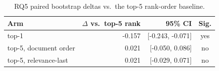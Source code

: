 \begin{table}[htbp]
  \centering
  \caption{RQ5 paired bootstrap deltas vs.\ the top-5 rank-order baseline.}
  \label{tab:rq5-deltas}
  \begin{tabular}{lrrc}
    \toprule
    Arm & $\Delta$ vs.\ top-5 rank & 95\% CI & Sig. \\
    \midrule
    top-1 & -0.157 & [-0.243, -0.071] & yes \\
    top-5, document order & 0.021 & [-0.050, 0.086] & no \\
    top-5, relevance-last & 0.021 & [-0.029, 0.071] & no \\
    \bottomrule
  \end{tabular}
\end{table}
